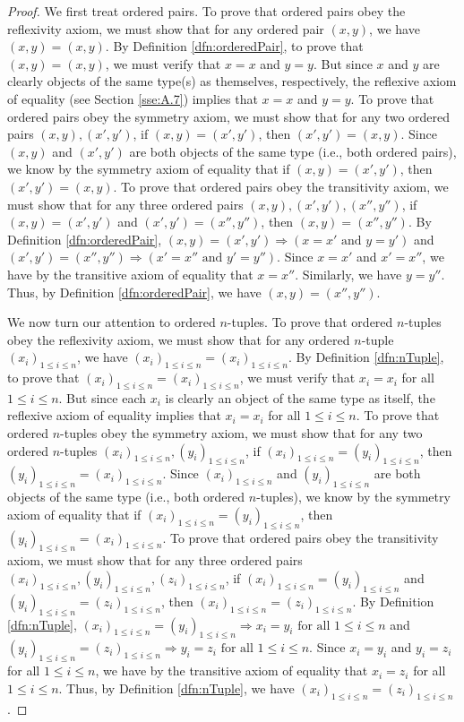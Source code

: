 \documentclass[../main.tex]{subfiles}
\begin{document}
\begin{enumerate}[ref={\thesection.\arabic*}]
\begin{proof}
        We first treat ordered pairs. To prove that ordered pairs obey the reflexivity axiom, we must show that for any ordered pair $(x,y)$, we have $(x,y)=(x,y)$. By Definition \ref{dfn:orderedPair}, to prove that $(x,y)=(x,y)$, we must verify that $x=x$ and $y=y$. But since $x$ and $y$ are clearly objects of the same type(s) as themselves, respectively, the reflexive axiom of equality (see Section \ref{sse:A.7}) implies that $x=x$ and $y=y$. To prove that ordered pairs obey the symmetry axiom, we must show that for any two ordered pairs $(x,y),(x',y')$, if $(x,y)=(x',y')$, then $(x',y')=(x,y)$. Since $(x,y)$ and $(x',y')$ are both objects of the same type (i.e., both ordered pairs), we know by the symmetry axiom of equality that if $(x,y)=(x',y')$, then $(x',y')=(x,y)$. To prove that ordered pairs obey the transitivity axiom, we must show that for any three ordered pairs $(x,y),(x',y'),(x'',y'')$, if $(x,y)=(x',y')$ and $(x',y')=(x'',y'')$, then $(x,y)=(x'',y'')$. By Definition \ref{dfn:orderedPair}, $(x,y)=(x',y') \Longrightarrow (x=x'\text{ and }y=y')$ and $(x',y')=(x'',y'') \Longrightarrow (x'=x''\text{ and }y'=y'')$. Since $x=x'$ and $x'=x''$, we have by the transitive axiom of equality that $x=x''$. Similarly, we have $y=y''$. Thus, by Definition \ref{dfn:orderedPair}, we have $(x,y)=(x'',y'')$.\par
        We now turn our attention to ordered $n$-tuples. To prove that ordered $n$-tuples obey the reflexivity axiom, we must show that for any ordered $n$-tuple $(x_i)_{1\leq i\leq n}$, we have $(x_i)_{1\leq i\leq n}=(x_i)_{1\leq i\leq n}$. By Definition \ref{dfn:nTuple}, to prove that $(x_i)_{1\leq i\leq n}=(x_i)_{1\leq i\leq n}$, we must verify that $x_i=x_i$ for all $1\leq i\leq n$. But since each $x_i$ is clearly an object of the same type as itself, the reflexive axiom of equality implies that $x_i=x_i$ for all $1\leq i\leq n$. To prove that ordered $n$-tuples obey the symmetry axiom, we must show that for any two ordered $n$-tuples $(x_i)_{1\leq i\leq n},(y_i)_{1\leq i\leq n}$, if $(x_i)_{1\leq i\leq n}=(y_i)_{1\leq i\leq n}$, then $(y_i)_{1\leq i\leq n}=(x_i)_{1\leq i\leq n}$. Since $(x_i)_{1\leq i\leq n}$ and $(y_i)_{1\leq i\leq n}$ are both objects of the same type (i.e., both ordered $n$-tuples), we know by the symmetry axiom of equality that if $(x_i)_{1\leq i\leq n}=(y_i)_{1\leq i\leq n}$, then $(y_i)_{1\leq i\leq n}=(x_i)_{1\leq i\leq n}$. To prove that ordered pairs obey the transitivity axiom, we must show that for any three ordered pairs $(x_i)_{1\leq i\leq n},(y_i)_{1\leq i\leq n},(z_i)_{1\leq i\leq n}$, if $(x_i)_{1\leq i\leq n}=(y_i)_{1\leq i\leq n}$ and $(y_i)_{1\leq i\leq n}=(z_i)_{1\leq i\leq n}$, then $(x_i)_{1\leq i\leq n}=(z_i)_{1\leq i\leq n}$. By Definition \ref{dfn:nTuple}, $(x_i)_{1\leq i\leq n}=(y_i)_{1\leq i\leq n} \Longrightarrow x_i=y_i\text{ for all }1\leq i\leq n$ and $(y_i)_{1\leq i\leq n}=(z_i)_{1\leq i\leq n} \Longrightarrow y_i=z_i\text{ for all }1\leq i\leq n$. Since $x_i=y_i$ and $y_i=z_i$ for all $1\leq i\leq n$, we have by the transitive axiom of equality that $x_i=z_i$ for all $1\leq i\leq n$. Thus, by Definition \ref{dfn:nTuple}, we have $(x_i)_{1\leq i\leq n}=(z_i)_{1\leq i\leq n}$.

\end{proof}
\end{enumerate}
\end{document}
